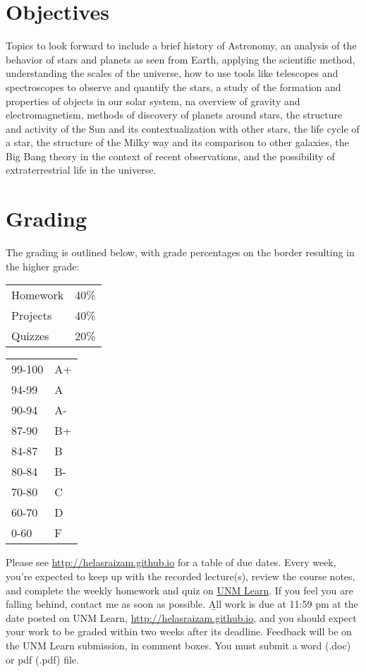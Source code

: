 \documentclass[12pt]{article}
\begin{document}
\section*{Objectives}
Topics to look forward to include a brief history of Astronomy, an analysis of the behavior of stars and planets as seen from Earth, applying the scientific method, understanding the scales of the universe, how to use tools like telescopes and spectroscopes to observe and quantify the stars, a study of the formation and properties of objects in our solar system, na overview of gravity and electromagnetism, methods of discovery of planets around stars, the structure and activity of the Sun and its contextualization with other stars, the life cycle of a star, the structure of the Milky way and its comparison to other galaxies, the Big Bang theory in the context of recent observations, and the possibility of extraterrestrial life in the universe.

\section*{Grading}
The grading is outlined below, with grade percentages on the border resulting in the higher grade:\\
\begin{minipage}[t]{.5\textwidth}\centering
    \begin{tabular}{l l}
      Homework&40\%\\
      Projects&40\%\\
      Quizzes&20\%\\
    \end{tabular}
\end{minipage}
\begin{minipage}[t]{.5\textwidth}\centering
    \begin{tabular}{l l}
      99-100&A+\\
      94-99&A\\
      90-94&A-\\
      87-90&B+\\
      84-87&B\\
      80-84&B-\\
      70-80&C\\
      60-70&D\\
      0-60&F
    \end{tabular}
\end{minipage}
Please see \url{http://helasraizam.github.io} for a table of due dates.  Every week, you're expected to keep up with the recorded lecture(s), review the course notes, and complete the weekly homework and quiz on \href{http://learn.unm.edu}{UNM Learn}.  If you feel you are falling behind, contact me as soon as possible.  \b{All work is due at 11:59 pm at the date posted on UNM Learn, \url{http://helasraizam.github.io}}, and you should expect your work to be graded within two weeks after its deadline.  Feedback will be on the UNM Learn submission, in comment boxes.  You must submit a word (.doc) or pdf (.pdf) file.
\end{document}
